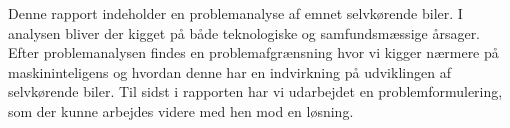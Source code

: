 Denne rapport indeholder en problemanalyse af emnet selvkørende biler. I analysen bliver der kigget på både teknologiske og samfundsmæssige årsager. Efter problemanalysen findes en problemafgrænsning hvor vi kigger nærmere på maskininteligens og hvordan denne har en indvirkning på udviklingen af selvkørende biler. Til sidst i rapporten har vi udarbejdet en problemformulering, som der kunne arbejdes videre med hen mod en løsning.